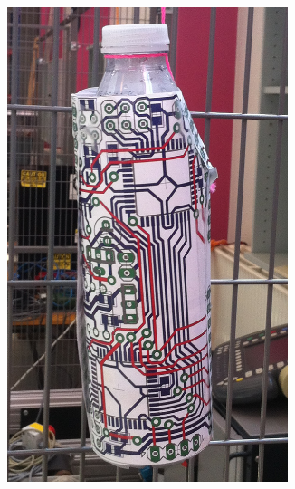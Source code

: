 \begin{figure}[htb]
	\centering
        \begin{subfigure}[b]{0.3\textwidth}
        \begin{center}
			\includegraphics[width=0.9\textwidth]{graphics/07_modelling/bottle_image.png}
			\end{center}
        \end{subfigure}
        \begin{subfigure}[b]{0.3\textwidth}
        \begin{center}

\end{center}
\end{subfigure}
\end{figure}
